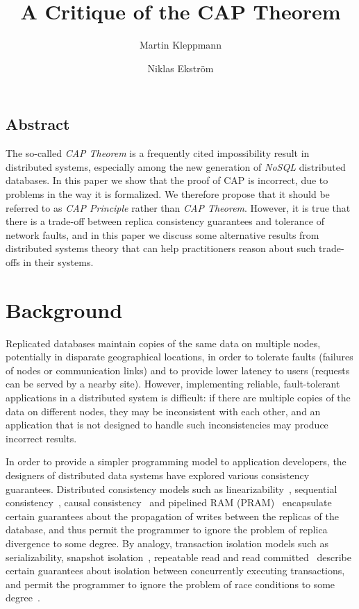 \documentclass[a4paper,twocolumn,10pt]{article}
\begin{document}
\sloppy
\date{} %
\title{A Critique of the CAP Theorem}
\author{Martin Kleppmann \and Niklas Ekstr{\"o}m}
\maketitle

\subsection*{Abstract}

The so-called \emph{CAP Theorem} is a frequently cited impossibility result in distributed systems,
especially among the new generation of \emph{NoSQL} distributed databases. In this paper we show
that the proof of CAP is incorrect, due to problems in the way it is formalized. We therefore
propose that it should be referred to as \emph{CAP Principle} rather than \emph{CAP Theorem}.
However, it is true that there is a trade-off between replica consistency guarantees and tolerance
of network faults, and in this paper we discuss some alternative results from distributed systems
theory that can help practitioners reason about such trade-offs in their systems.

\section{Background}

Replicated databases maintain copies of the same data on multiple nodes, potentially in disparate
geographical locations, in order to tolerate faults (failures of nodes or communication links) and
to provide lower latency to users (requests can be served by a nearby site). However, implementing
reliable, fault-tolerant applications in a distributed system is difficult: if there are multiple
copies of the data on different nodes, they may be inconsistent with each other, and an application
that is not designed to handle such inconsistencies may produce incorrect results.

In order to provide a simpler programming model to application developers, the designers of
distributed data systems have explored various consistency guarantees. Distributed consistency
models such as linearizability~\cite{Herlihy1990jq}, sequential consistency~\cite{Lamport1979ky},
causal consistency~\cite{Ahamad1995gl} and pipelined RAM (PRAM)~\cite{Lipton1988uh} encapsulate
certain guarantees about the propagation of writes between the replicas of the database, and thus
permit the programmer to ignore the problem of replica divergence to some degree. By analogy,
transaction isolation models such as serializability, snapshot isolation~\cite{Berenson1995kj},
repeatable read and read committed~\cite{Gray1976us} describe certain guarantees about isolation
between concurrently executing transactions, and permit the programmer to ignore the problem of race
conditions to some degree~\cite{Bailis2014vc}.
\end{document}
